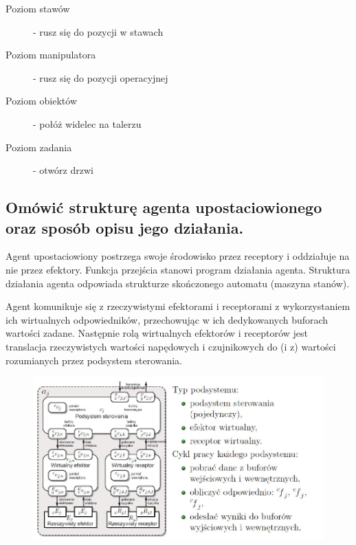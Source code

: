 \begin{description}
    \item[Poziom stawów] - rusz się do pozycji w stawach
    \item[Poziom manipulatora] - rusz się do pozycji operacyjnej
    \item[Poziom obiektów] - połóż widelec na talerzu
    \item[Poziom zadania] - otwórz drzwi
\end{description}

\subsection{Omówić strukturę agenta upostaciowionego oraz sposób opisu jego działania.}
Agent upostaciowiony postrzega swoje środowisko przez receptory i oddziałuje na nie przez efektory. Funkcja przejścia stanowi program działania agenta. Struktura działania agenta odpowiada strukturze skończonego automatu (maszyna stanów).

Agent komunikuje się z rzeczywistymi efektorami i receptorami z wykorzystaniem ich wirtualnych odpowiedników, przechowując w ich dedykowanych buforach wartości zadane. Następnie rolą wirtualnych efektorów i receptorów jest translacja rzeczywistych wartości napędowych i czujnikowych do (i z) wartości rozumianych przez podsystem sterowania.

\begin{figure}[H]
\includegraphics[width=\linewidth]{fig/Agent upostaciowiony.png}
\end{figure}


